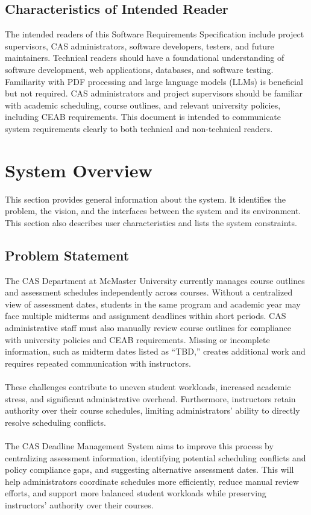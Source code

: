 \documentclass[12pt]{article}
\begin{document}
\subsection{Characteristics of Intended Reader} \label{sec_IntendedReader}

The intended readers of this Software Requirements Specification include 
project supervisors, CAS administrators, software developers, testers, and future 
maintainers. Technical readers should have a foundational understanding of software 
development, web applications, databases, and software testing. Familiarity with PDF 
processing and large language models (LLMs) is beneficial but not required. 
CAS administrators and project supervisors should be familiar with academic scheduling, 
course outlines, and relevant university policies, including CEAB requirements. This document is intended to communicate 
system requirements clearly to both technical and non-technical readers.

\section{System Overview} \label{sec_SysOverview}

This section provides general information about the system.  It identifies the
problem, the vision, and the interfaces between the system and its environment.
This section also describes user characteristics and lists the system
constraints.

\subsection{Problem Statement}

The CAS Department at McMaster University currently manages 
course outlines and assessment schedules independently across courses. Without a centralized 
view of assessment dates, students in the same program and academic year may face multiple
midterms and assignment deadlines within short periods. CAS administrative staff must also 
manually review course outlines for compliance with university policies and CEAB requirements. 
Missing or incomplete information, such as midterm dates listed as ``TBD,'' 
creates additional work and requires repeated communication with instructors.
\\\\
These challenges contribute to uneven student workloads, increased academic stress, and 
significant administrative overhead. Furthermore, instructors retain authority over their 
course schedules, limiting administrators' ability to directly resolve scheduling conflicts.
\\\\
The CAS Deadline Management System aims to improve this process by centralizing assessment 
information, identifying potential scheduling conflicts and policy compliance gaps, and 
suggesting alternative assessment dates. This will help administrators coordinate schedules 
more efficiently, reduce manual review efforts, and support more balanced student workloads 
while preserving instructors' authority over their courses.
\end{document}
